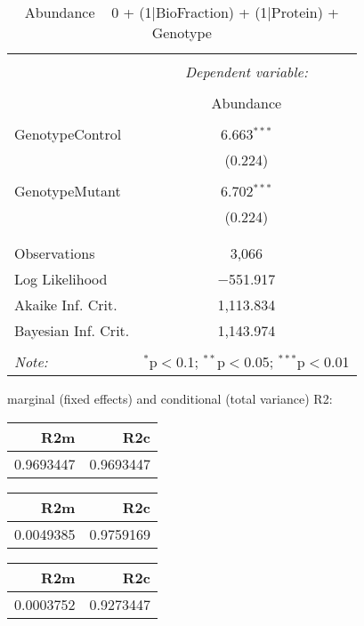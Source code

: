 \documentclass[11pt]{report}
\begin{document}
\begin{table}[!htbp] \centering 
  \caption{Abundance ~ 0 + (1|BioFraction) + (1|Protein) + Genotype} 
  \label{} 
\begin{tabular}{@{\extracolsep{5pt}}lc} 
\\[-1.8ex]\hline 
\hline \\[-1.8ex] 
 & \multicolumn{1}{c}{\textit{Dependent variable:}} \\ 
\cline{2-2} 
\\[-1.8ex] & Abundance \\ 
\hline \\[-1.8ex] 
 GenotypeControl & 6.663$^{***}$ \\ 
  & (0.224) \\ 
  & \\ 
 GenotypeMutant & 6.702$^{***}$ \\ 
  & (0.224) \\ 
  & \\ 
\hline \\[-1.8ex] 
Observations & 3,066 \\ 
Log Likelihood & $-$551.917 \\ 
Akaike Inf. Crit. & 1,113.834 \\ 
Bayesian Inf. Crit. & 1,143.974 \\ 
\hline 
\hline \\[-1.8ex] 
\textit{Note:}  & \multicolumn{1}{r}{$^{*}$p$<$0.1; $^{**}$p$<$0.05; $^{***}$p$<$0.01} \\ 
\end{tabular} 
\end{table} 
marginal (fixed effects) and conditional (total variance) R2:

\begin{tabular}{r|r}
\hline
R2m & R2c\\
\hline
0.9693447 & 0.9693447\\
\hline
\end{tabular}

\begin{tabular}{r|r}
\hline
R2m & R2c\\
\hline
0.0049385 & 0.9759169\\
\hline
\end{tabular}

\begin{tabular}{r|r}
\hline
R2m & R2c\\
\hline
0.0003752 & 0.9273447\\
\hline
\end{tabular}
\end{document}
